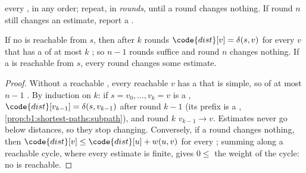 \label{out:b1:shortest-paths:negative}

\begin{method}\label{met:b1:shortest-paths:bellman-ford}
 every , in any order; repeat, in \emph{rounds}, until a round changes nothing. If round $n$ still changes an
estimate, report a .
\end{method}

\label{lst:b1:shortest-paths:bellman-ford}

\begin{proposition}\label{prop:b1:shortest-paths:rounds}
If no  is reachable from $s$, then after $k$ rounds $\code{dist}[v] = \delta(s, v)$ for every  $v$
that has a  of at most $k$ ; so $n - 1$ rounds suffice and round $n$ changes nothing. If a  is reachable from $s$, every round changes some estimate.
\end{proposition}

\begin{proof}
Without a reachable , every reachable $v$ has a  that is simple, so of at most $n - 1$ .
By induction on $k$: if $s = v_0, \dots, v_k = v$ is a , $\code{dist}[v_{k-1}] = \delta(s, v_{k-1})$ after
round $k - 1$ (its prefix is a , \cref{prop:b1:shortest-paths:subpath}), and round $k$  $v_{k-1}
\to v$. Estimates never go below distances, so they stop changing. Conversely, if a round changes nothing, then
$\code{dist}[v] \leq \code{dist}[u] + w(u, v)$ for every ; summing along a reachable cycle, where every estimate is
finite, gives $0 \leq$ the weight of the cycle: no  is reachable.
\end{proof}

